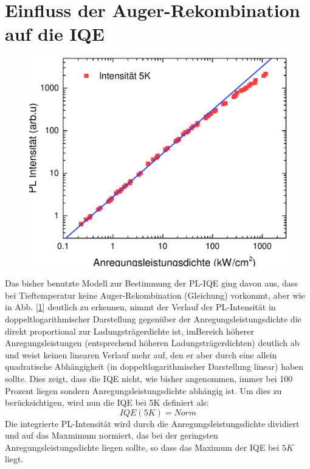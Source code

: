 \newpage

\section{Einfluss der Auger-Rekombination auf die IQE}
%
\begin{figure}[h!]
    \centering
    \begin{minipage}[t]{0.5\linewidth}
        \centering
        \includegraphics[width=\linewidth]{Bilder/AugerBei5K.pdf}
        \caption{}
        \label{fig:auger5k}
    \end{minipage}%
\end{figure}
\raggedright
Das bisher benutzte Modell zur Bestimmung der PL-IQE ging davon aus, dass bei Tieftemperatur keine Auger-Rekombination (Gleichung) vorkommt, aber wie in Abb. [\ref{fig:auger5k}] deutlich zu erkennen, nimmt der Verlauf der PL-Intensität in doppeltlogarithmischer Darstellung gegenüber der Anregungsleistungsdichte die direkt proportional zur Ladungsträgerdichte ist, imBereich höherer Anregungsleistungen (entsprechend höheren Ladungsträgerdichten) deutlich ab und weist keinen linearen Verlauf mehr auf, den er aber durch eine allein quadratische Abhängigkeit (in doppeltlogarithmischer Darstellung linear) haben sollte. Dies zeigt,
dass die IQE nicht, wie bisher angenommen, immer bei 100 Prozent liegen sondern Anregungsleistungsdichte abhängig ist. Um dies zu berücksichtigen, wird nun die IQE bei 5K definiert als:
\begin{equation}
    IQE(5K) = Norm
\end{equation}
Die integrierte PL-Intensität wird durch die Anregungsleistungsdichte dividiert und auf das Maxmimum normiert, das bei der geringsten Anregungsleistungsdichte liegen sollte, so dass das Maximum der IQE bei $5K$ liegt. 

%
